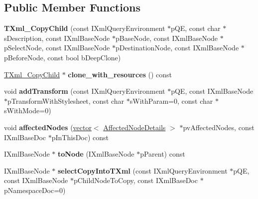 \subsection*{\-Public \-Member \-Functions}
\begin{DoxyCompactItemize}
\item 
\hypertarget{classgeneral__server_1_1TXml__CopyChild_a1dfceb1263bed5c7b1a8639d420b6268}{{\bfseries \-T\-Xml\-\_\-\-Copy\-Child} (const \-I\-Xml\-Query\-Environment $\ast$p\-Q\-E, const char $\ast$s\-Description, const \-I\-Xml\-Base\-Node $\ast$p\-Base\-Node, const \-I\-Xml\-Base\-Node $\ast$p\-Select\-Node, const \-I\-Xml\-Base\-Node $\ast$p\-Destination\-Node, const \-I\-Xml\-Base\-Node $\ast$p\-Before\-Node, const bool b\-Deep\-Clone)}\label{classgeneral__server_1_1TXml__CopyChild_a1dfceb1263bed5c7b1a8639d420b6268}

\item 
\hypertarget{classgeneral__server_1_1TXml__CopyChild_a0e5e39b02b128a4b5635169fb82ef866}{\hyperlink{classgeneral__server_1_1TXml__CopyChild}{\-T\-Xml\-\_\-\-Copy\-Child} $\ast$ {\bfseries clone\-\_\-with\-\_\-resources} () const }\label{classgeneral__server_1_1TXml__CopyChild_a0e5e39b02b128a4b5635169fb82ef866}

\item 
\hypertarget{classgeneral__server_1_1TXml__CopyChild_a5a0af329b4bc34295e8c6fe4b123e3fe}{void {\bfseries add\-Transform} (const \-I\-Xml\-Query\-Environment $\ast$p\-Q\-E, const \-I\-Xml\-Base\-Node $\ast$p\-Transform\-With\-Stylesheet, const char $\ast$s\-With\-Param=0, const char $\ast$s\-With\-Mode=0)}\label{classgeneral__server_1_1TXml__CopyChild_a5a0af329b4bc34295e8c6fe4b123e3fe}

\item 
\hypertarget{classgeneral__server_1_1TXml__CopyChild_a34ced941967623854b343599322100bb}{void {\bfseries affected\-Nodes} (\hyperlink{classvector}{vector}$<$ \hyperlink{structgeneral__server_1_1TXml_1_1AffectedNodeDetails}{\-Affected\-Node\-Details} $>$ $\ast$pv\-Affected\-Nodes, const \-I\-Xml\-Base\-Doc $\ast$p\-In\-This\-Doc) const }\label{classgeneral__server_1_1TXml__CopyChild_a34ced941967623854b343599322100bb}

\item 
\hypertarget{classgeneral__server_1_1TXml__CopyChild_ac7507becd91183c34ae7ab22da825265}{\-I\-Xml\-Base\-Node $\ast$ {\bfseries to\-Node} (\-I\-Xml\-Base\-Node $\ast$p\-Parent) const }\label{classgeneral__server_1_1TXml__CopyChild_ac7507becd91183c34ae7ab22da825265}

\item 
\hypertarget{classgeneral__server_1_1TXml__CopyChild_a09201e074600d87ab8af548c7cdb9b53}{\-I\-Xml\-Base\-Node $\ast$ {\bfseries select\-Copy\-Into\-T\-Xml} (const \-I\-Xml\-Query\-Environment $\ast$p\-Q\-E, const \-I\-Xml\-Base\-Node $\ast$p\-Child\-Node\-To\-Copy, const \-I\-Xml\-Base\-Doc $\ast$p\-Namespace\-Doc=0)}\label{classgeneral__server_1_1TXml__CopyChild_a09201e074600d87ab8af548c7cdb9b53}

\end{DoxyCompactItemize}

